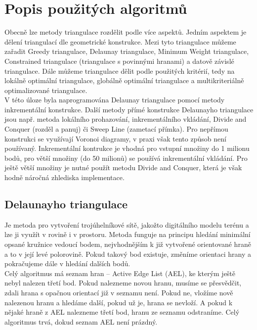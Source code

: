 \documentclass[a4paper,11pt,twoside]{article}
\begin{document}

\newpage
\vspace*{-1cm}
\section{Popis použitých algoritmů}
\noindent
Obecně lze metody triangulace rozdělit podle více aspektů. Jedním aspektem je dělení triangulací dle geometrické konstrukce. Mezi tyto triangulace můžeme zařadit Greedy triangulace, Delaunay triangulace, Minimum Weight triangulace, Constrained triangulace (triangulace s povinnými hranami) a datově závislé triangulace. Dále můžeme triangulace dělit podle použitých kritérií, tedy na lokálně optimální triangulace, globálně optimální triangulace a multikriteriálně optimalizované triangulace. \\
\indent V této úloze byla naprogramována Delaunay triangulace pomocí metody inkrementální konstrukce. Další metody přímé konstrukce Delaunayho triangulace jsou např. metoda lokálního prohazování, inkrementálního vkládání, Divide and Conquer (rozděl a panuj) či Sweep Line (zametací přímka). Pro nepřímou konstrukci se využívají Voronoi diagramy, v praxi však tento způsob není používaný. Inkrementální kontrukce je vhodná pro vstupní množiny do 1 milionu bodů, pro větší množiny (do 50 milionů) se používá inkrementální vkládání. Pro ještě větší množiny je nutné použít metodu Divide and Conquer, která je však hodně náročná zhlediska implementace.
\large

\subsection{Delaunayho triangulace}
Je metoda pro vytvoření trojúhelníkové sítě, jakožto digitálního modelu terénu a lze ji využít v rovině i v prostoru.
Metoda funguje na principu hledání minimální opsané kružnice vedoucí bodem, nejvhodnějším k již vytvořené orientované hraně a to v její levé polorovině. Pokud takový bod existuje, změníme orientaci hrany a pokračujeme dále v hledání dalších bodů. \\
\indent Celý algoritmus má seznam hran – Active Edge List (AEL), ke kterým ještě nebyl nalezen třetí bod. Pokud nalezneme novou hranu, musíme se přesvědčit, zdali hrana s opačnou orientací již v seznamu není. Pokud ne, vložíme nově nalezenou hranu a hledáme další, pokud už je, hrana se nevloží. A pokud k nějaké hraně z AEL nalezneme třetí bod, hranu ze seznamu odstraníme. Celý algoritmus trvá, dokud seznam AEL není prázdný. \\
\end{document}
